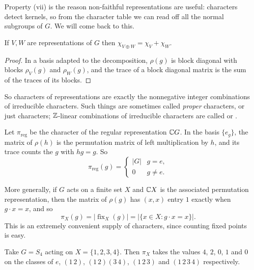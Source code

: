 \documentclass[a4paper]{scrartcl}
\begin{document}
Property (vii) is the reason non-faithful representations are useful: characters detect kernels, so from the character table we can read off all the normal subgroups of $G$. We will come back to this.

\begin{proposition}
	If $V, W$ are representations of $G$ then $\chi_{V \oplus W} = \chi_V + \chi_W$.
\end{proposition}
\begin{proof}
	In a basis adapted to the decomposition, $\rho(g)$ is block diagonal with blocks $\rho_V(g)$ and $\rho_W(g)$, and the trace of a block diagonal matrix is the sum of the traces of its blocks.
\end{proof}

So characters of representations are exactly the nonnegative integer combinations of irreducible characters. Such things are sometimes called \emph{proper} characters, or just characters; $\mathbb{Z}$-linear combinations of irreducible characters are called  or .

\begin{example}
	Let $\pi_{\text{reg}}$ be the character of the regular representation $\mathbb{C} G$. In the basis $\{e_g\}$, the matrix of $\rho(h)$ is the permutation matrix of left multiplication by $h$, and its trace counts the $g$ with $hg = g$. So
	$$\pi_{\text{reg}}(g) = \begin{cases} |G| & g = e, \\ 0 & g \neq e.\end{cases}$$
\end{example}

\begin{example}
	More generally, if $G$ acts on a finite set $X$ and $\mathbb{C} X$ is the associated permutation representation, then the matrix of $\rho(g)$ has $(x,x)$ entry $1$ exactly when $g\cdot x = x$, and so
	$$\pi_X(g) = |\operatorname{fix}_X(g)| = |\{x \in X: g\cdot x = x\}|.$$
	This is an extremely convenient supply of characters, since counting fixed points is easy.
\end{example}

\begin{example}
	Take $G = S_4$ acting on $X = \{1,2,3,4\}$. Then $\pi_X$ takes the values $4$, $2$, $0$, $1$ and $0$ on the classes of $e$, $(1\,2)$, $(1\,2)(3\,4)$, $(1\,2\,3)$ and $(1\,2\,3\,4)$ respectively.
\end{example}
\end{document}
